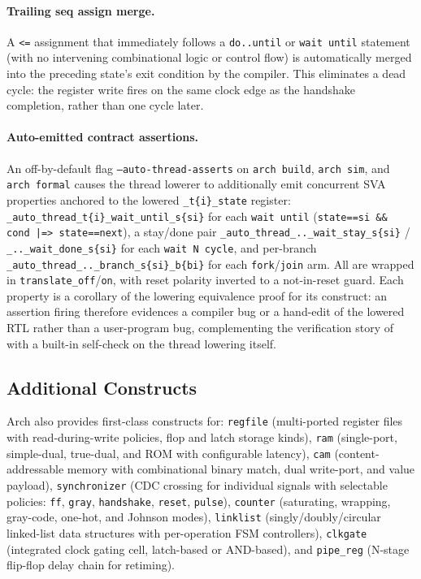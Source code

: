 \documentclass[11pt,twocolumn]{article}
\begin{document}
\paragraph{Trailing seq assign merge.} A \texttt{<=} assignment that immediately follows a \texttt{do..until} or \texttt{wait until} statement (with no intervening combinational logic or control flow) is automatically merged into the preceding state's exit condition by the compiler. This eliminates a dead cycle: the register write fires on the same clock edge as the handshake completion, rather than one cycle later.

\paragraph{Auto-emitted contract assertions.} An off-by-default flag \texttt{--auto-thread-asserts} on \texttt{arch build}, \texttt{arch sim}, and \texttt{arch formal} causes the thread lowerer to additionally emit concurrent SVA properties anchored to the lowered \texttt{\_t\{i\}\_state} register: \texttt{\_auto\_thread\_t\{i\}\_wait\_until\_s\{si\}} for each \texttt{wait until} (\texttt{state==si \&\& cond |=> state==next}), a stay/done pair \texttt{\_auto\_thread\_..\_wait\_stay\_s\{si\}} / \texttt{\_..\_wait\_done\_s\{si\}} for each \texttt{wait N cycle}, and per-branch \texttt{\_auto\_thread\_..\_branch\_s\{si\}\_b\{bi\}} for each \texttt{fork}/\texttt{join} arm. All are wrapped in \texttt{translate\_off}/\texttt{on}, with reset polarity inverted to a not-in-reset guard. Each property is a corollary of the lowering equivalence proof for its construct: an assertion firing therefore evidences a compiler bug or a hand-edit of the lowered RTL rather than a user-program bug, complementing the verification story of  with a built-in self-check on the thread lowering itself.

\subsection{Additional Constructs}

Arch also provides first-class constructs for:
\texttt{regfile} (multi-ported register files with read-during-write policies, flop and latch storage kinds),
\texttt{ram} (single-port, simple-dual, true-dual, and ROM with configurable latency),
\texttt{cam} (content-addressable memory with combinational binary match, dual write-port, and value payload),
\texttt{synchronizer} (CDC crossing for individual signals with selectable policies: \texttt{ff}, \texttt{gray}, \texttt{handshake}, \texttt{reset}, \texttt{pulse}),
\texttt{counter} (saturating, wrapping, gray-code, one-hot, and Johnson modes),
\texttt{linklist} (singly/doubly/circular linked-list data structures with per-operation FSM controllers),
\texttt{clkgate} (integrated clock gating cell, latch-based or AND-based), and
\texttt{pipe\_reg} (N-stage flip-flop delay chain for retiming).
\end{document}
